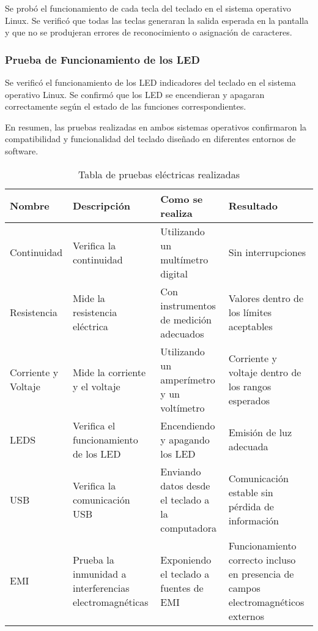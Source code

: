 Se probó el funcionamiento de cada tecla del teclado en el sistema operativo \gls{Linux}. Se verificó que todas las teclas generaran la salida esperada en la pantalla y que no se produjeran errores de reconocimiento o asignación de caracteres.

\subsubsection{Prueba de Funcionamiento de los \gls{LED}}

Se verificó el funcionamiento de los \gls{LED} indicadores del teclado en el sistema operativo \gls{Linux}. Se confirmó que los \gls{LED} se encendieran y apagaran correctamente según el estado de las funciones correspondientes.

En resumen, las pruebas realizadas en ambos sistemas operativos confirmaron la compatibilidad y funcionalidad del teclado diseñado en diferentes entornos de software.

\begin{table}[h]
\small
\begin{tabular}{|l|p{2cm}|p{2.5cm}|p{3cm}|}
\hline
Nombre & Descripción & Como se realiza & Resultado \\
\hline
Continuidad & Verifica la continuidad & Utilizando un multímetro digital & Sin interrupciones \\
\hline
Resistencia & Mide la resistencia eléctrica & Con instrumentos de medición adecuados & Valores dentro de los límites aceptables \\
\hline
Corriente y Voltaje & Mide la corriente y el voltaje & Utilizando un amperímetro y un voltímetro & Corriente y voltaje dentro de los rangos esperados \\
\hline
\gls{LED}S & Verifica el funcionamiento de los \gls{LED} & Encendiendo y apagando los \gls{LED} & Emisión de luz adecuada \\
\hline
\gls{USB} & Verifica la comunicación \gls{USB} & Enviando datos desde el teclado a la computadora & Comunicación estable sin pérdida de información \\
\hline
\gls{EMI} & Prueba la inmunidad a interferencias electromagnéticas & Exponiendo el teclado a fuentes de \gls{EMI} & Funcionamiento correcto incluso en presencia de campos electromagnéticos externos \\
\hline
\end{tabular}
\caption{Tabla de pruebas eléctricas realizadas}
\label{Table:PruebasElectricas}
\end{table}

